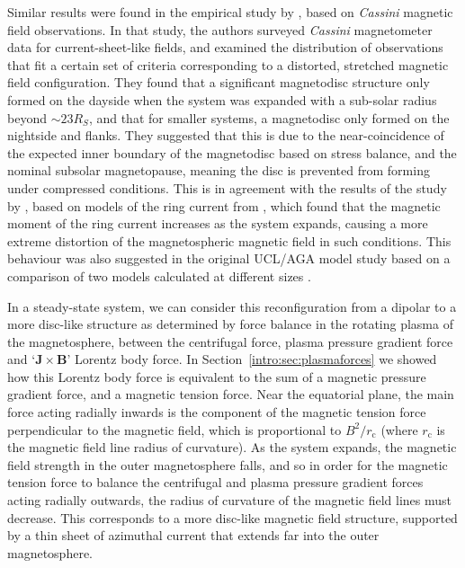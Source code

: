 Similar results were found in the empirical study by \citet{arridge2008}, based on \textit{Cassini} magnetic field observations. In that study, the authors surveyed \textit{Cassini} magnetometer data for current-sheet-like fields, and examined the distribution of observations that fit a certain set of criteria corresponding to a distorted, stretched magnetic field configuration. They found that a significant magnetodisc structure only formed on the dayside when the system was expanded with a sub-solar radius beyond ${\sim}{23}{R_S}$, and that for smaller systems, a magnetodisc only formed on the nightside and flanks. They suggested that this is due to the near-coincidence of the expected inner boundary of the magnetodisc based on stress balance, and the nominal subsolar magnetopause, meaning the disc is prevented from forming under compressed conditions. This is in agreement with the results of the study by \citet{bunce2008}, based on models of the ring current from \citet{bunce2007}, which found that the magnetic moment of the ring current increases as the system expands, causing a more extreme distortion of the magnetospheric magnetic field in such conditions. This behaviour was also suggested in the original UCL/AGA model study based on a comparison of two models calculated at different sizes \citet{achilleos1010a}.

In a steady-state system, we can consider this reconfiguration from a dipolar to a more disc-like structure  as determined by force balance in the rotating plasma of the magnetosphere, between the centrifugal force, plasma pressure gradient force and `$\boldsymbol{J}\times\boldsymbol{B}$' Lorentz body force. In Section~\ref{intro:sec:plasmaforces} we showed how this Lorentz body force is equivalent to the sum of a magnetic pressure gradient force, and a magnetic tension force. Near the equatorial plane, the main force acting radially inwards is the component of the magnetic tension force perpendicular to the magnetic field, which is proportional to $B^2/r_\mathrm{c}$ (where $r_\mathrm{c}$ is the magnetic field line radius of curvature). As the system expands, the magnetic field strength in the outer magnetosphere falls, and so in order for the magnetic tension force to balance the centrifugal and plasma pressure gradient forces acting radially outwards, the radius of curvature of the magnetic field lines must decrease. This corresponds to a more disc-like magnetic field structure, supported by a thin sheet of azimuthal current that extends far into the outer magnetosphere. 


